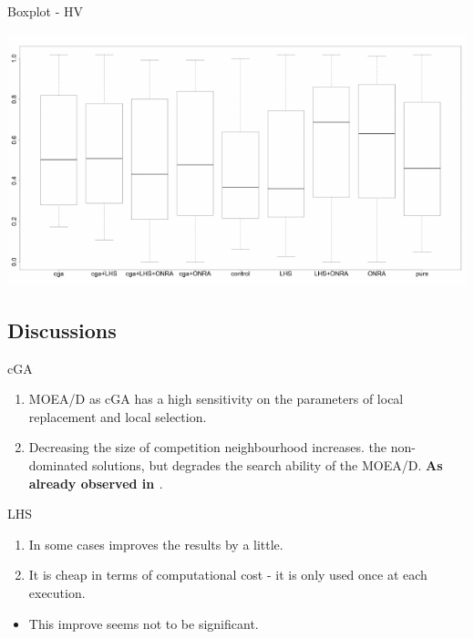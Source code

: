 \documentclass[ignorenonframetext,]{beamer}
\providecommand{\tightlist}{%
  \setlength{\itemsep}{0pt}\setlength{\parskip}{0pt}}
\begin{document}
\begin{frame}{Boxplot - HV}

\centering
\includegraphics{cellular_moead_files/figure-beamer/unnamed-chunk-5-1.pdf}

\end{frame}

\subsection{Discussions}\label{discussions}

\begin{frame}{cGA}

\begin{enumerate}
\def\labelenumi{\arabic{enumi}.}
\tightlist
\item
  MOEA/D as cGA has a high sensitivity on the parameters of local
  replacement and local selection.
\item
  Decreasing the size of competition neighbourhood increases. the
  non-dominated solutions, but degrades the search ability of the
  MOEA/D. \textbf{As already observed in \citet{ishibuchi2009adaptation}
  }.
\end{enumerate}

\end{frame}

\begin{frame}{LHS}

\begin{enumerate}
\def\labelenumi{\arabic{enumi}.}
\tightlist
\item
  In some cases improves the results by a little.
\item
  It is cheap in terms of computational cost - it is only used once at
  each execution.
\end{enumerate}

\begin{itemize}
\tightlist
\item
  This improve seems not to be significant.
\end{itemize}

\end{frame}
\end{document}
